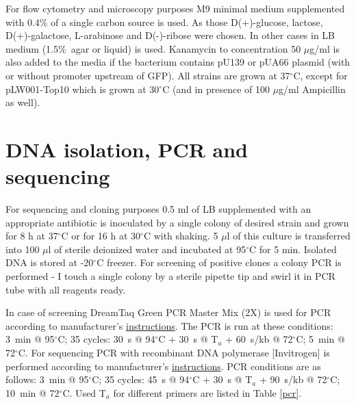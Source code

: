 For flow cytometry and microscopy purposes M9 minimal medium supplemented with 0.4\% of a single carbon source is used.
As those D(+)-glucose, lactose, D(+)-galactose, L-arabinose and D(-)-ribose were chosen.
In other cases in LB medium (1.5\%~agar or liquid) is used.
Kanamycin to concentration 50 $\mu$g/ml is also added to the media if the bacterium contains pU139 or pUA66 plasmid (with or without promoter upstream of GFP).
All strains are grown at 37$^{\circ}$C, except for pLW001-Top10 which is grown at 30$^{\circ}$C (and in presence of 100 $\mu$g/ml Ampicillin as well).


\section{DNA isolation, PCR and sequencing}
For sequencing and cloning purposes 0.5 ml of LB supplemented with an appropriate antibiotic is inoculated by a single colony of desired strain and grown for 8 h at 37$^{\circ}$C or for 16 h at 30$^{\circ}$C with shaking.
5 $\mu$l of this culture is transferred into 100 $\mu$l of sterile deionized water and incubated at 95$^{\circ}$C for 5 min.
Isolated DNA is stored at -20$^{\circ}$C freezer.
For screening of positive clones a colony PCR is performed - I touch a single colony by a sterile pipette tip and swirl it in PCR tube with all reagents ready.

In case of screening DreamTaq Green PCR Master Mix (2X) is used for PCR according to manufacturer's \href{https://assets.thermofisher.com/TFS-Assets/LSG/manuals/MAN0012704_DreamTaq_Green_PCR_MasterMix_K1081_UG.pdf}{instructions}.
The PCR is run at these conditions: 3~min @ 95$^{\circ}$C; 35 cycles: 30~s @ 94$^{\circ}$C + 30~s @ T$_{a}$ + 60~s/kb @ 72$^{\circ}$C; 5~min @ 72$^{\circ}$C.
For sequencing PCR with recombinant  DNA polymerase [Invitrogen] is performed according to manufacturer's \href{https://assets.thermofisher.com/TFS-Assets/LSG/manuals/0814_Taq_DNA_Polymerase_recombinant.pdf}{instructions}.
PCR conditions are as follows: 3~min @ 95$^{\circ}$C; 35 cycles: 45~s @ 94$^{\circ}$C + 30~s @ T$_{a}$ + 90~s/kb @ 72$^{\circ}$C; 10~min @ 72$^{\circ}$C. Used T$_{a}$ for different primers are listed in Table \ref{pcr}.

